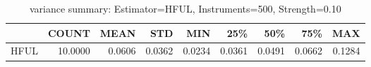 \begin{table}[ht]
\centering
\caption{variance summary: Estimator=HFUL, Instruments=500, Strength=0.10}
\begin{tabular}{lrrrrrrrr}
\toprule
 & COUNT & MEAN & STD & MIN & 25\% & 50\% & 75\% & MAX \\
\midrule
HFUL & 10.0000 & 0.0606 & 0.0362 & 0.0234 & 0.0361 & 0.0491 & 0.0662 & 0.1284 \\
\bottomrule
\end{tabular}
\end{table}
